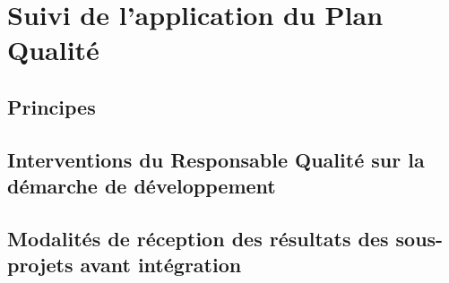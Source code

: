 \section{Suivi de l'application du Plan Qualité}

\subsection{Principes}

\subsection{Interventions du Responsable Qualité sur la démarche de développement}

\subsection{Modalités de réception des résultats des sous-projets avant intégration}

\pagebreak
